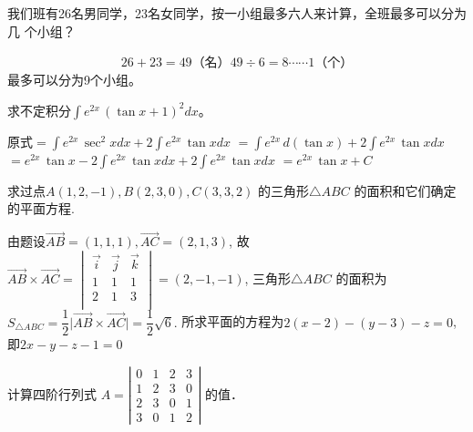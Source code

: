 \begin{question}
我们班有26名男同学，23名女同学，按一小组最多六人来计算，全班最多可以分为几
    个小组？
\end{question}

\begin{solution}
  \begin{align*}
    26 + 23 = 49\text{（名）}
    49 \div 6 = 8 \cdots \cdots 1 \text{（个）}
  \end{align*}
  最多可以分为9个小组。
\end{solution}


\begin{question}
求不定积分$\displaystyle\int e^{2x}\,(\tan x+1)^2 dx$。
\end{question}

\begin{solution}
\everymath{\displaystyle}%
原式$=\int e^{2x}\,\sec^2 x dx+2\int e^{2x}\,\tan x dx$ 
\hspace{5em}${}=\int e^{2x}\,d(\tan x)+ 2\int e^{2x}\,\tan x dx$ 
\hspace{5em}${}= e^{2x}\,\tan x - 2\int e^{2x}\,\tan x dx+ 2\int e^{2x}\,\tan x dx$ 
\hspace{5em}${}= e^{2x}\,\tan x + C$ 
\end{solution}


\begin{question}
求过点$A(1,2,-1), B(2,3,0),C(3,3,2)$ 的三角形$\triangle ABC$ 的面积和它们确定的平面方程.
\end{question}

\begin{solution}
由题设$\overrightarrow{AB}=(1,1,1),\overrightarrow{AC}=(2,1,3)$, 
故$\overrightarrow{AB}\times \overrightarrow{AC}=\begin{vmatrix}
\vec{i}&\vec{j} &\vec{k}\\
1&1&1\\
2&1&3\\
\end{vmatrix}=(2,-1,-1)$, 
三角形$\triangle ABC$ 的面积为$S_{\triangle ABC}=\dfrac{1}{2}\big|\overrightarrow{AB}\times
\overrightarrow{AC}\big|=\dfrac{1}{2}\sqrt{6}.$ 
所求平面的方程为$2(x-2)-(y-3)-z=0$, 即$2x-y-z-1=0$ 			
\end{solution}


\begin{question}
计算四阶行列式 $A = \left|\begin{array}{cccc}
  0 & 1 & 2 & 3\\
  1 & 2 & 3 & 0\\
  2 & 3 & 0 & 1\\
  3 & 0 & 1 & 2
\end{array}\right|$ 的值．
\end{question}

